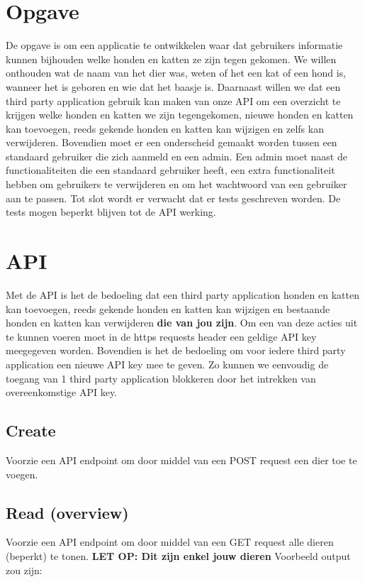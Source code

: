 \documentclass{article}
\begin{document}
\section{Opgave}
De opgave is om een applicatie te ontwikkelen waar dat gebruikers informatie kunnen bijhouden welke honden en katten ze zijn tegen gekomen. We willen onthouden wat de naam van het dier was, weten of het een kat of een hond is, wanneer het is geboren en wie dat het baasje is. Daarnaast willen we dat een third party application gebruik kan maken van onze API om  een overzicht te krijgen welke honden en katten we zijn tegengekomen, nieuwe honden en katten kan toevoegen, reeds gekende honden en katten kan wijzigen en zelfs kan verwijderen. Bovendien moet er een onderscheid gemaakt worden tussen een standaard gebruiker die zich aanmeld en een admin. Een admin moet naast de functionaliteiten die een standaard gebruiker heeft, een extra functionaliteit hebben om gebruikers te verwijderen en om het wachtwoord van een gebruiker aan te passen. Tot slot wordt er verwacht dat er tests geschreven worden. De tests mogen beperkt blijven tot de API werking.

\section{API}
Met de API is het de bedoeling dat een third party application honden en katten kan toevoegen, reeds gekende honden en katten kan wijzigen en bestaande honden en katten kan verwijderen \textbf{die van jou zijn}. Om een van deze acties uit te kunnen voeren moet in de https requests header een geldige API key meegegeven worden. Bovendien is het de bedoeling om voor iedere third party application een nieuwe API key mee te geven. Zo kunnen we eenvoudig de toegang van 1 third party application blokkeren door het intrekken van overeenkomstige API key.

\subsection{Create}
Voorzie een API endpoint om door middel van een POST request een dier toe te voegen.

\subsection{Read (overview)}
Voorzie een API endpoint om door middel van een GET request alle dieren (beperkt) te tonen. \textbf{LET OP: Dit zijn enkel jouw dieren} Voorbeeld output zou zijn:
\end{document}
